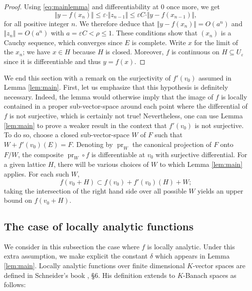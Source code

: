 \documentclass{lms}
\DeclareMathOperator{\pr}{pr}
\begin{document}
\begin{proof}
Using \eqref{eq:mainlemma} and differentiability at $0$ once more,
we get
$$\Vert y  - f(x_n) \Vert 
\leq \varepsilon \cdot \Vert z_{n-1} \Vert \leq \varepsilon C \cdot \Vert 
y - f(x_{n-1}) \Vert,$$
for all positive integer $n$.  We therefore deduce that $\Vert y - f(x_n) \Vert = O(a^n)$ and 
$\Vert z_n \Vert = O(a^n)$ with $a = \varepsilon C < \rho \leq 1$. 
These conditions show that $(x_n)$ is a Cauchy sequence, which converges since $E$ is complete.
Write $x$ for the limit of the $x_n$; we have $x \in H$ because $H$ is closed.
Moreover, $f$ is continuous on $H \subseteq U_\varepsilon$ since it is differentiable and thus $y=f(x)$.
\end{proof}

We end this section with a remark on the surjectivity of $f'(v_0)$ assumed in
Lemma \ref{lem:main}. First, let us 
emphasize that this hypothesis is definitely necessary. Indeed, the lemma would 
otherwise imply that the image of $f$ is locally contained in a proper 
sub-vector-space around each point where the differential of $f$ is not 
surjective, which is certainly not true! Nevertheless, one can use Lemma \ref{lem:main}
to prove a weaker result in the context that $f'(v_0)$ is not surjective.
To do so, choose a closed sub-vector-space $W$ of $F$ such that $W + f'(v_0)(E) = 
F$. Denoting by $\pr_W$ the canonical projection of $F$ onto 
$F/W$, the composite $\pr_W \circ f$ is differentiable at 
$v_0$ with surjective differential. For a given lattice $H$, there will be various choices of $W$ to which Lemma \ref{lem:main}
applies.  For each such $W$,
\begin{equation}
\label{eq:notsurjective}
f(v_0 + H) \subset f(v_0) + f'(v_0)(H) + W;
\end{equation}
taking the intersection of the right hand side
over all possible $W$ yields an upper bound on $f(v_0 + H)$.

\subsection{The case of locally analytic functions}
\label{ssec:locanalytic}

We consider in this subsection the case where $f$ is locally analytic.
Under this extra assumption, we make explicit the constant $\delta$ 
which appears in Lemma \ref{lem:main}.
Locally analytic functions over finite dimensional $K$-vector spaces are 
defined in Schneider's book \cite {schneider:11a}, \S 6. His definition 
extends to $K$-Banach spaces as follows:
\end{document}
